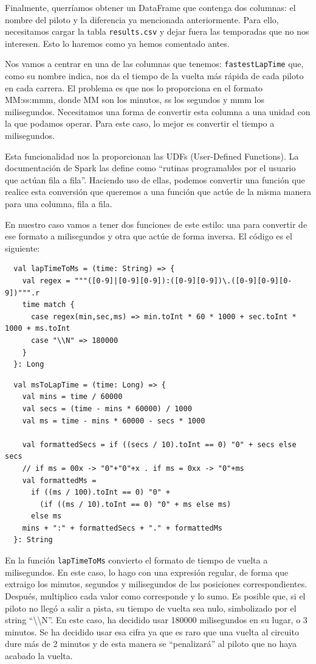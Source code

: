 \documentclass[12pt,twoside,titlepage]{report}
\newcommand{\quotes}[1]{``#1''}
\begin{document}
Finalmente, querríamos obtener un DataFrame que contenga dos columnas: el nombre del piloto y la diferencia ya mencionada anteriormente. Para ello, necesitamos cargar la tabla \texttt{results.csv} y dejar fuera las temporadas que no nos interesen. Esto lo haremos como ya hemos comentado antes.

Nos vamos a centrar en una de las columnas que tenemos: \texttt{fastestLapTime} que, como su nombre indica, nos da el tiempo de la vuelta más rápida de cada piloto en cada carrera. El problema es que nos lo proporciona en el formato MM:ss:mmm, donde MM son los minutos, ss los segundos y mmm los milisegundos. Necesitamos una forma de convertir esta columna a una unidad con la que podamos operar. Para este caso, lo mejor es convertir el tiempo a milisegundos.

Esta funcionalidad nos la proporcionan las UDFs (User-Defined Functions). La documentación de Spark las define como \quotes{rutinas programables por el usuario que actúan fila a fila}. Haciendo uso de ellas, podemos convertir una función que realice esta conversión que queremos a una función que actúe de la misma manera para una columna, fila a fila.

En nuestro caso vamos a tener dos funciones de este estilo: una para convertir de ese formato a milisegundos y otra que actúe de forma inversa. El código es el siguiente:


\begin{lstlisting}
  val lapTimeToMs = (time: String) => {
    val regex = """([0-9]|[0-9][0-9]):([0-9][0-9])\.([0-9][0-9][0-9])""".r
    time match {
      case regex(min,sec,ms) => min.toInt * 60 * 1000 + sec.toInt * 1000 + ms.toInt
      case "\\N" => 180000
    }
  }: Long
\end{lstlisting}

\begin{lstlisting}
  val msToLapTime = (time: Long) => {
    val mins = time / 60000
    val secs = (time - mins * 60000) / 1000
    val ms = time - mins * 60000 - secs * 1000

    val formattedSecs = if ((secs / 10).toInt == 0) "0" + secs else secs
    // if ms = 00x -> "0"+"0"+x . if ms = 0xx -> "0"+ms
    val formattedMs =
      if ((ms / 100).toInt == 0) "0" +
        (if ((ms / 10).toInt == 0) "0" + ms else ms)
      else ms
    mins + ":" + formattedSecs + "." + formattedMs
  }: String
\end{lstlisting}

En la función \texttt{lapTimeToMs} convierto el formato de tiempo de vuelta a milisegundos. En este caso, lo hago con una expresión regular, de forma que extraigo los minutos, segundos y milisegundos de las posiciones correspondientes. Después, multiplico cada valor como corresponde y lo sumo. Es posible que, si el piloto no llegó a salir a pista, su tiempo de vuelta sea nulo, simbolizado por el string \quotes{\textbackslash\textbackslash N}. En este caso, ha decidido usar 180000 milisegundos en su lugar, o 3 minutos. Se ha decidido usar esa cifra ya que es raro que una vuelta al circuito dure más de 2 minutos y de esta manera se \quotes{penalizará} al piloto que no haya acabado la vuelta.
\end{document}
